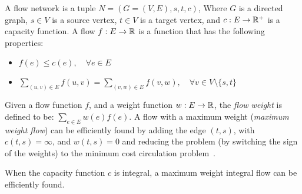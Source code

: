 A flow network is a tuple $N = (G = (V, E), s, t, c)$, 
Where $G$ is a directed graph, 
$s \in V$ is a source vertex, 
$t \in V$ is a target vertex, 
and $c : E \rightarrow \mathbb{R}^+$ is a capacity function. 
A flow $f : E \rightarrow \mathbb{R}$ is a function that has the following properties:
\begin{itemize}
\item
$f(e) \leq c(e), \quad \forall e \in E$

\item
$\sum_{(u, v) \in E} f(u, v) = \sum_{(v, w) \in E} f(v, w), \quad \forall v \in V \setminus \{s, t\}$
\end{itemize}

Given a flow function $f$, 
and a weight function $w: E \rightarrow \mathbb{R}$, 
the \emph{flow weight} is defined to be:
$\sum_{e \in E}{w(e)f(e)}$.
A flow with a maximum weight (\emph{maximum weight flow}) can be efficiently found by adding 
the edge $(t, s)$, with $c(t,s) = \infty$, and $w(t,s) = 0$ and reducing the problem
(by switching the sign of the weights) 
to the minimum cost circulation problem~\cite{tardos1985strongly}.

When the capacity function $c$ is integral, 
a maximum weight integral flow can be efficiently found.  
